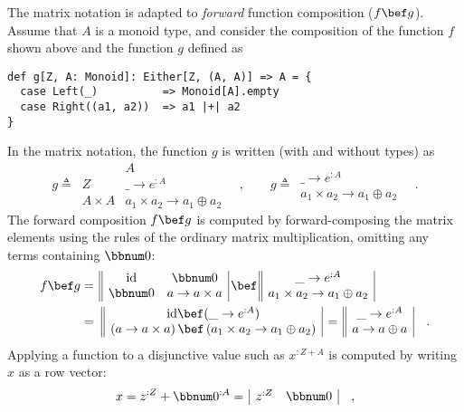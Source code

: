 The matrix notation is adapted to \emph{forward} function composition
($f\bef g$). Assume that $A$ is a monoid type, and consider the
composition of the function $f$ shown above and the function $g$
defined as
\begin{lstlisting}
def g[Z, A: Monoid]: Either[Z, (A, A)] => A = {
  case Left(_)          => Monoid[A].empty
  case Right((a1, a2))  => a1 |+| a2
}
\end{lstlisting}
In the matrix notation, the function $g$ is written (with and without
types) as
\[
g\triangleq\,\begin{array}{|c||c|}
 & A\\
\hline Z & \_\rightarrow e^{:A}\\
A\times A & a_{1}\times a_{2}\rightarrow a_{1}\oplus a_{2}
\end{array}\quad,\quad\quad g\triangleq\,\begin{array}{||c|}
\_\rightarrow e^{:A}\\
a_{1}\times a_{2}\rightarrow a_{1}\oplus a_{2}
\end{array}\quad.
\]
The forward composition $f\bef g$ is computed by forward-composing
the matrix elements using the rules of the ordinary matrix multiplication,
omitting any terms containing $\bbnum 0$:
\begin{align*}
f\bef g & =\,\begin{array}{||cc|}
\text{id} & \bbnum 0\\
\bbnum 0 & a\rightarrow a\times a
\end{array}\,\bef\,\begin{array}{||c|}
\_\rightarrow e^{:A}\\
a_{1}\times a_{2}\rightarrow a_{1}\oplus a_{2}
\end{array}\\
 & =\,\,\begin{array}{||c|}
\text{id}\bef(\_\rightarrow e^{:A})\\
\left(a\rightarrow a\times a\right)\bef\left(a_{1}\times a_{2}\rightarrow a_{1}\oplus a_{2}\right)
\end{array}\,=\,\begin{array}{||c|}
\_\rightarrow e^{:A}\\
a\rightarrow a\oplus a
\end{array}\quad.
\end{align*}
Applying a function to a disjunctive value such as $x^{:Z+A}$ is
computed by writing $x$ as a row vector:
\[
x=z^{:Z}+\bbnum 0^{:A}=\,\begin{array}{|cc|}
z^{:Z} & \bbnum 0\end{array}\quad,
\]
